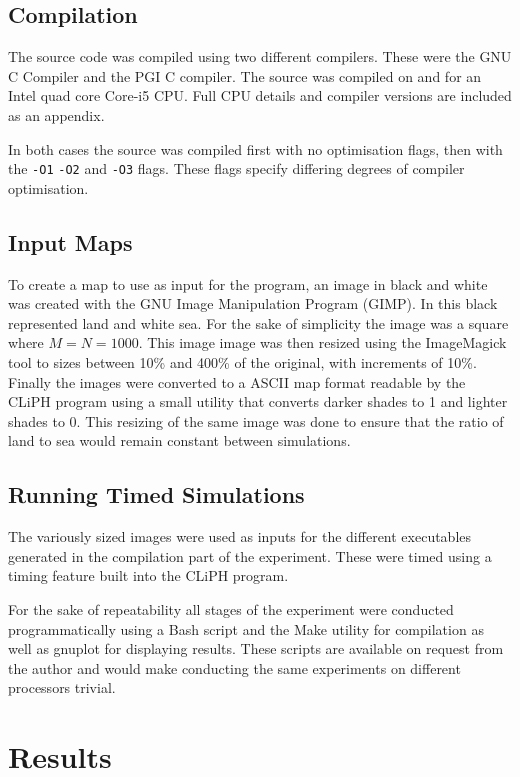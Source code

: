\documentclass[a4paper,12pt]{article}
\begin{document}
\subsection{Compilation}

The source code was compiled using two different compilers. These were the GNU C Compiler and the PGI C compiler. The source was compiled on and for an Intel quad core Core-i5 CPU. Full CPU details and compiler versions are included as an appendix.

In both cases the source was compiled first with no optimisation flags, then with the \verb|-O1| \verb|-O2| and \verb|-O3| flags. These flags specify differing degrees of compiler optimisation.

\subsection{Input Maps}
To create a map to use as input for the program, an image in black and white was created with the GNU Image Manipulation Program (GIMP). In this black represented land and white sea. For the sake of simplicity the image was a square where $M = N = 1000$. This image image was then resized using the ImageMagick tool to sizes between 10\% and 400\% of the original, with increments of 10\%. Finally the images were converted to a ASCII map format readable by the CLiPH program using a small utility that converts darker shades to 1 and lighter shades to 0. This resizing of the same image was done to ensure that the ratio of land to sea would remain constant between simulations.

\subsection{Running Timed Simulations}
The variously sized images were used as inputs for the different executables generated in the compilation part of the experiment. These were timed using a timing feature built into the CLiPH program.

For the sake of repeatability all stages of the experiment were conducted programmatically using a Bash script and the Make utility for compilation as well as gnuplot for displaying results. These scripts are available on request from the author and would make conducting the same experiments on different processors trivial.

\section{Results}
\end{document}
